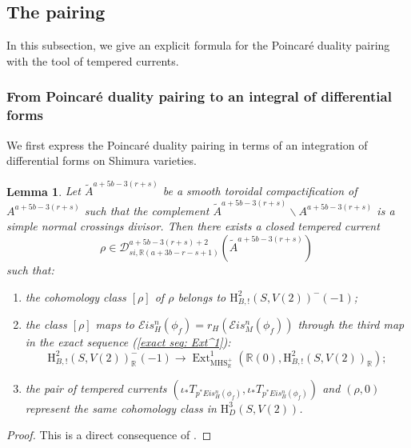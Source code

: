 \documentclass[11pt, a4paper]{amsart}
\theoremstyle{plain}
\newtheorem{lemma}[theorem]{Lemma}
\theoremstyle{definition}
\numberwithin{equation}{section}
\def\RR{\mathbb{R}}
\DeclareMathOperator{\Ext}{Ext}
\begin{document}
\subsection{The pairing}
\label{SS the pairing}
In this subsection, we give an explicit formula for the Poincar\'{e} duality pairing with the tool of tempered currents. 

\subsubsection{From Poincar\'{e} duality pairing to an integral of differential forms} 
We first express the Poincar\'{e} duality pairing in terms of an integration of differential forms on Shimura varieties. 

\begin{lemma}
\label{Lemma: tempered current associated to Eis classes}
    Let $\widetilde{A}^{a + 5b - 3(r + s)}$ be a smooth toroidal compactification of $A^{a + 5b - 3(r + s)}$ such that the complement
    $\widetilde{A}^{a + 5b - 3(r + s)} \backslash A^{a + 5b - 3(r + s)}$ is a simple normal crossings divisor. Then there exists a closed tempered current 
    \begin{equation*}
        \rho \in \mathcal{D}_{si, \RR(a + 3b - r - s + 1)}^{a + 5b - 3(r + s) + 2}(\widetilde{A}^{a + 5b - 3(r + s)})\
    \end{equation*}
    such that: 
    \begin{enumerate}
        \item the cohomology class $[\rho]$ of $\rho$ belongs to $\mathrm{H}^{2}_{B, !}(S, V(2))^{-}(-1)$; 
        \item the class $[\rho]$ maps to $\mathcal{E}is_{H}^{n}(\phi_f) = r_{H}(\mathcal{E}is_{M}^{n}(\phi_f))$ 
            through the third map in the exact sequence (\ref{exact seq: Ext^1}):
            \begin{equation*}
                \mathrm{H}^{2}_{B, !}(S, V(2))_{\RR}^{-}(-1) \rightarrow \Ext^{1}_{\mathrm{MHS}_{\RR}^{+}}(\RR(0), \mathrm{H}^{2}_{B, !}(S, V(2))_{\RR}); 
            \end{equation*}
        \item the pair of tempered currents $(\iota_{*}T_{p^{*}Eis_{H}^{n}(\phi_f)}, \iota_{*} T_{p^{*}Eis_{B}^{n}(\phi_f)})$ and $(\rho, 0)$ represent the same cohomology class in $\mathrm{H}^{3}_{D} (S, V(2))$. 
    \end{enumerate}
\end{lemma}

\begin{proof}
   This is a direct consequence of \cite[\S 5.7.]{Bei83}.
\end{proof}
\end{document}
